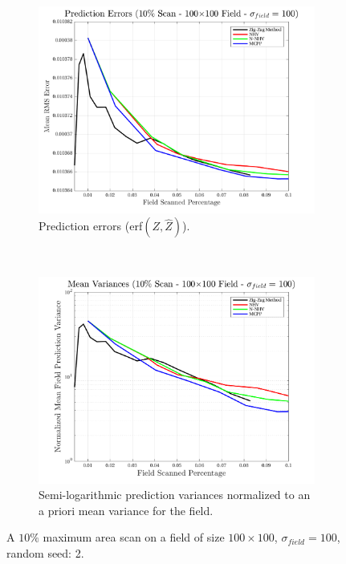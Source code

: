 \begin{figure}[htb!]
    \centering
    \begin{subfigure}[t]{0.65\textwidth}
        \centering
        \includegraphics[width=\linewidth]{figures/hbresults/pred_errs_10p_100x100_sf_100_seed_2.png}
        \captionsetup{skip=0.20\baselineskip,size=footnotesize}
        \caption{Prediction errors (erf$(Z,\hat{Z})$).}
        \label{fig:prederrs_sigma100_p10_s2}
    \end{subfigure}%
    \\
    \begin{subfigure}[t]{0.65\textwidth}
        \centering
        \includegraphics[width=\linewidth]{figures/hbresults/vars_10p_100x100_sf_100_seed_2.png}
        \captionsetup{skip=0.20\baselineskip,size=footnotesize}
        \caption{Semi-logarithmic prediction variances normalized to an a priori mean variance for the field.}
        \label{fig:prederrs_sigma100_p10_s2}
    \end{subfigure}
    \captionsetup{skip=0.20\baselineskip}
    \caption{A $10\%$ maximum area scan on a field of size $100 \times 100$, $\sigma_{field} = 100$, random seed: 2.}
    \label{fig:sigma100_p10_s2}
\end{figure}

